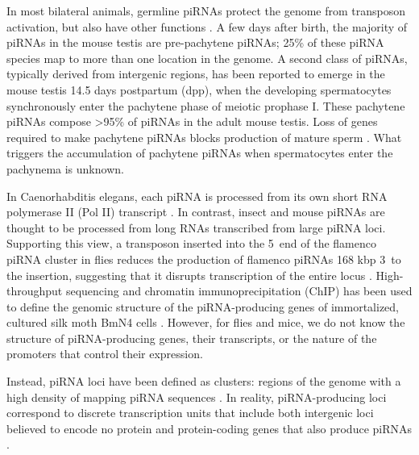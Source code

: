   In most bilateral animals, germline piRNAs protect the genome from transposon activation, but also have other functions \citep{Aravin2001, Aravin2007a, Aravin2008a, Vagin2004, Brennecke2007, Carmell2007, Hartig2007, Kuramochi-Miyagawa2008, Ashe2012, Lee2012, Shirayama2012}. A few days after birth, the majority of piRNAs in the mouse testis are pre-pachytene piRNAs; 25\% of these piRNA species map to more than one location in the genome. A second class of piRNAs, typically derived from intergenic regions, has been reported to emerge in the mouse testis 14.5 days postpartum (dpp), when the developing spermatocytes synchronously enter the pachytene phase of meiotic prophase I. These pachytene piRNAs compose >95\% of piRNAs in the adult mouse testis. Loss of genes required to make pachytene piRNAs blocks production of mature sperm \citep{Deng2002c, Aravin2001, Reuter2011, Vourekas2012}. What triggers the accumulation of pachytene piRNAs when spermatocytes enter the pachynema is unknown.

  In Caenorhabditis elegans, each piRNA is processed from its own short RNA polymerase II (Pol II) transcript \citep{Gu2012}. In contrast, insect and mouse piRNAs are thought to be processed from long RNAs transcribed from large piRNA loci. Supporting this view, a transposon inserted into the 5\textprime~end of the flamenco piRNA cluster in flies reduces the production of flamenco piRNAs 168 kbp 3\textprime~to the insertion, suggesting that it disrupts transcription of the entire locus \citep{Brennecke2007}. High-throughput sequencing and chromatin immunoprecipitation (ChIP) has been used to define the genomic structure of the piRNA-producing genes of immortalized, cultured silk moth BmN4 cells \citep{Kawaoka2012}. However, for flies and mice, we do not know the structure of piRNA-producing genes, their transcripts, or the nature of the promoters that control their expression.

  Instead, piRNA loci have been defined as clusters: regions of the genome with a high density of mapping piRNA sequences \citep{Aravin2006,Girard2006, Grivna2006,Lau2006,Brennecke2007,Ro2007}. In reality, piRNA-producing loci correspond to discrete transcription units that include both intergenic loci believed to encode no protein \citep{Brennecke2007,Brennecke2008, Vourekas2012} and protein-coding genes that also produce piRNAs \citep{Aravin2007, Robine2009, Saito2009}.

